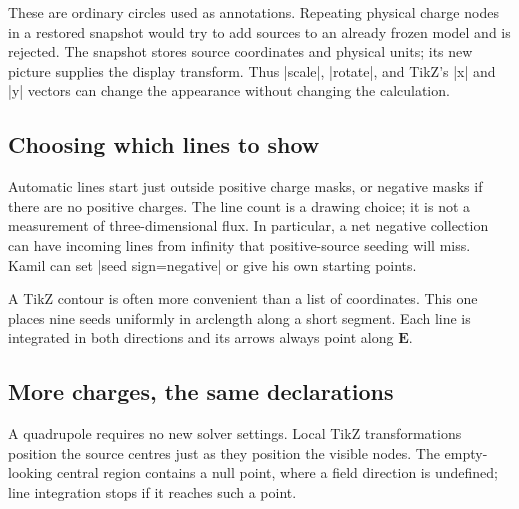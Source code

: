 \begin{codeexample}[width=0pt]
\end{codeexample}

These are ordinary circles used as annotations. Repeating physical charge nodes
in a restored snapshot would try to add sources to an already frozen model and
is rejected. The snapshot stores source coordinates and physical units; its new
picture supplies the display transform. Thus |scale|, |rotate|, and TikZ's |x|
and |y| vectors can change the appearance without changing the calculation.

\subsection{Choosing which lines to show}
Automatic lines start just outside positive charge masks, or negative masks if
there are no positive charges. The line count is a drawing choice; it is not a
measurement of three-dimensional flux. In particular, a net negative collection
can have incoming lines from infinity that positive-source seeding will miss.
Kamil can set |seed sign=negative| or give his own starting points.

A TikZ contour is often more convenient than a list of coordinates. This one
places nine seeds uniformly in arclength along a short segment. Each line is
integrated in both directions and its arrows always point along $\mathbf E$.

\begin{codeexample}[width=0pt]
\end{codeexample}

\subsection{More charges, the same declarations}
A quadrupole requires no new solver settings. Local TikZ transformations position
the source centres just as they position the visible nodes. The empty-looking
central region contains a null point, where a field direction is undefined;
line integration stops if it reaches such a point.

